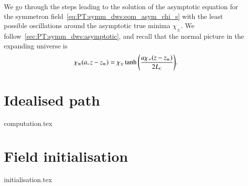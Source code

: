 



\newcommand{\brchi}{\breve{\chi}}
\newcommand{\brq}{\breve{q}}
\newcommand{\sppt}{\ALIASsppt}
\newcommand{\eqregimenum}{\ALIASeqregimenum}






We go through the steps leading to the solution of the asymptotic equation for the symmetron field~\cref{eq:PT:symm_dws:eom_asym_chi_s} with the least possible oscillations around the asymptotic true minima $\chi_\pm$.  
We follow~\cref{sec:PT:symm_dws:asymptotic}, and recall that the normal picture in the expanding universe is
\begin{equation}
    \chi_\mathrm{w}(a, z-z_\mathrm{w}) = \chi_\pm \tanh{ {\left( \frac{a\chi_+(z-z\ensuremath{_\mathrm{w}})}{2L_{\text{\tiny{C}}}}  \right)}}.
\end{equation}






\section{Idealised path}\label{app:stablesym:computation}
    {{computation.tex}}




\section{Field initialisation}\label{app:stablesym:initialisation}
    {{initialisation.tex}}